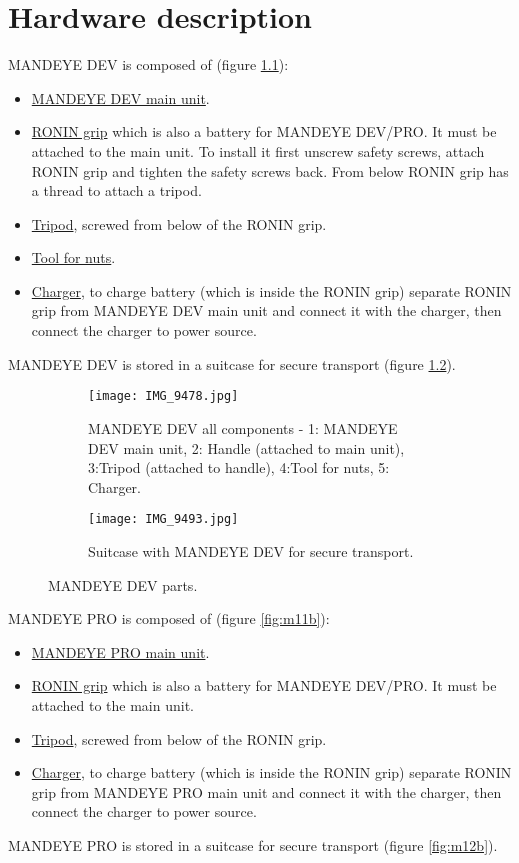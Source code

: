 \chapter{Hardware description}
MANDEYE DEV is composed of (figure \ref{fig:m11}):
\begin{itemize}
	\item \underline{MANDEYE DEV main unit}.
	\item \underline{RONIN grip} which is also a battery for MANDEYE DEV/PRO. It must be attached to the main unit. To install it first unscrew safety screws, attach RONIN grip and tighten the safety screws back. From below RONIN grip has a thread to attach a tripod.
	\item \underline{Tripod}, screwed from below of the RONIN grip.
	\item \underline{Tool for nuts}.
	\item \underline{Charger}, to charge battery (which is inside the RONIN grip) separate RONIN grip from MANDEYE DEV main unit and connect it with the charger, then connect the charger to power source.
\end{itemize}
MANDEYE DEV is stored in a suitcase for secure transport (figure \ref{fig:m12}).
\newpage
\begin{figure}[H]
	\centering
	\begin{subfigure}[b]{0.7\textwidth}
		\centering
		\texttt{[image: IMG\_9478.jpg]}
		\caption{MANDEYE DEV all components - 1: MANDEYE DEV main unit, 2: Handle (attached to main unit), 3:Tripod (attached to handle), 4:Tool for nuts, 5: Charger.}
		\label{fig:m11}
	\end{subfigure}
	\hfill
	\begin{subfigure}[b]{0.7\textwidth}
		\centering
		\texttt{[image: IMG\_9493.jpg]}
		\caption{Suitcase with MANDEYE DEV for secure transport.}
		\label{fig:m12}
	\end{subfigure}
	\caption{MANDEYE DEV parts.}
	\label{fig:mandeye_hardware}
\end{figure}

MANDEYE PRO is composed of (figure \ref{fig:m11b}):
\begin{itemize}
	\item \underline{MANDEYE PRO main unit}.
	\item \underline{RONIN grip} which is also a battery for MANDEYE DEV/PRO. It must be attached to the main unit. 
	\item \underline{Tripod}, screwed from below of the RONIN grip.
	\item \underline{Charger}, to charge battery (which is inside the RONIN grip) separate RONIN grip from MANDEYE PRO main unit and connect it with the charger, then connect the charger to power source.
\end{itemize}
MANDEYE PRO is stored in a suitcase for secure transport (figure \ref{fig:m12b}).

